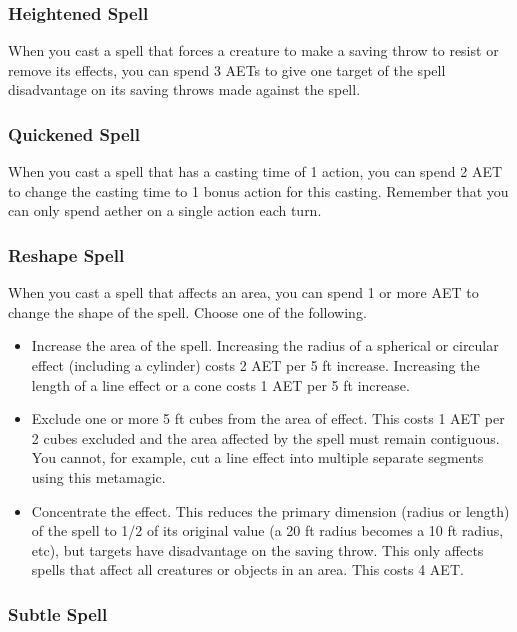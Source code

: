 \subsubsection{Heightened Spell}

When you cast a spell that forces a creature to make a saving throw to resist or remove its effects, you can spend 3 AETs to give one target of the spell disadvantage on its saving throws made against the spell.

\subsubsection{Quickened Spell}

When you cast a spell that has a casting time of 1 action, you can spend 2 AET to change the casting time to 1 bonus action for this casting. Remember that you can only spend aether on a single action each turn.

\subsubsection{Reshape Spell}
When you cast a spell that affects an area, you can spend 1 or more AET to change the shape of the spell. Choose one of the following.
\begin{itemize}
  \item Increase the area of the spell. Increasing the radius of a spherical or circular effect (including a cylinder) costs 2 AET per 5 ft increase. Increasing the length of a line effect or a cone costs 1 AET per 5 ft increase.
  \item Exclude one or more 5 ft cubes from the area of effect. This costs 1 AET per 2 cubes excluded and the area affected by the spell must remain contiguous. You cannot, for example, cut a line effect into multiple separate segments using this metamagic.
  \item Concentrate the effect. This reduces the primary dimension (radius or length) of the spell to 1/2 of its original value (a 20 ft radius becomes a 10 ft radius, etc), but targets have disadvantage on the saving throw. This only affects spells that affect all creatures or objects in an area. This costs 4 AET.
\end{itemize}

\subsubsection{Subtle Spell}

